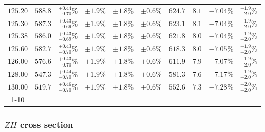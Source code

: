 \begin{table}[ht!]
{{\begin{tabular}{| cc | c | ccc | ccc | c |}
$125.20$ & $588.8$ & $^{+0.44}_{-0.70}\%$ & $\pm 1.9\%$ & {\color{black!55}$\pm 1.8\%$} & {\color{black!55}$\pm 0.6\%$} & $624.7$ & $8.1$ & $-7.04\%$ & $^{+1.9}_{-2.0}\%$ \\
$125.30$ & $587.3$ & $^{+0.43}_{-0.69}\%$ & $\pm 1.9\%$ & {\color{black!55}$\pm 1.8\%$} & {\color{black!55}$\pm 0.6\%$} & $623.1$ & $8.1$ & $-7.04\%$ & $^{+1.9}_{-2.0}\%$ \\
$125.38$ & $586.0$ & $^{+0.43}_{-0.69}\%$ & $\pm 1.9\%$ & {\color{black!55}$\pm 1.8\%$} & {\color{black!55}$\pm 0.6\%$} & $621.8$ & $8.0$ & $-7.04\%$ & $^{+1.9}_{-2.0}\%$ \\
$125.60$ & $582.7$ & $^{+0.43}_{-0.70}\%$ & $\pm 1.9\%$ & {\color{black!55}$\pm 1.8\%$} & {\color{black!55}$\pm 0.6\%$} & $618.3$ & $8.0$ & $-7.05\%$ & $^{+1.9}_{-2.0}\%$ \\
$126.00$ & $576.6$ & $^{+0.43}_{-0.70}\%$ & $\pm 1.9\%$ & {\color{black!55}$\pm 1.8\%$} & {\color{black!55}$\pm 0.6\%$} & $611.9$ & $7.9$ & $-7.07\%$ & $^{+1.9}_{-2.0}\%$ \\
$128.00$ & $547.3$ & $^{+0.44}_{-0.70}\%$ & $\pm 1.9\%$ & {\color{black!55}$\pm 1.8\%$} & {\color{black!55}$\pm 0.6\%$} & $581.3$ & $7.6$ & $-7.17\%$ & $^{+1.9}_{-2.0}\%$ \\
$130.00$ & $519.7$ & $^{+0.46}_{-0.70}\%$ & $\pm 1.9\%$ & {\color{black!55}$\pm 1.8\%$} & {\color{black!55}$\pm 0.6\%$} & $552.6$ & $7.3$ & $-7.28\%$ & $^{+2.0}_{-2.0}\%$ \\
\cline{1-10}
\end{tabular}
}
}
\end{table}






\FloatBarrier
\subsubsection{$ZH$ cross section}

